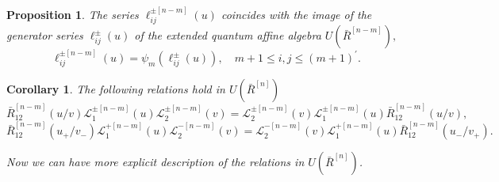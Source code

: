 \documentclass[10pt,a4paper]{amsart}
\newtheorem{coro}[theorem]{Corollary}
\newtheorem{proposition}[theorem]{Proposition}
\numberwithin{equation}{section}
\begin{document}
\begin{proposition}\cite{JLM2}
The series $\ell_{i j}^{ \pm[n-m]}(u)$ coincides with the image of the generator series $\ell_{i j}^{ \pm}(u)$ of the extended quantum affine algebra $U\left(\bar{R}^{[n-m]}\right),$
$$
\ell_{i j}^{ \pm[n-m]}(u)=\psi_m\left(\ell_{i j}^{ \pm}(u)\right), \quad m+1 \leqslant i, j \leqslant(m+1)^{\prime}.
$$ 	
\end{proposition}
\begin{coro}\cite{JLM2}\label{c:18}
 The following relations hold in $U\left(\bar{R}^{[n]}\right)$
 $$
 \bar{R}_{12}^{[n-m]}(u / v) \mathcal{L}_1^{ \pm[n-m]}(u) \mathcal{L}_2^{ \pm[n-m]}(v)=\mathcal{L}_2^{ \pm[n-m]}(v) \mathcal{L}_1^{ \pm[n-m]}(u) \bar{R}_{12}^{[n-m]}(u / v),
 $$	
 $$
 \bar{R}_{12}^{[n-m]}\left(u_{+} / v_{-}\right) \mathcal{L}_1^{+[n-m]}(u) \mathcal{L}_2^{-[n-m]}(v)=\mathcal{L}_2^{-[n-m]}(v) \mathcal{L}_1^{+[n-m]}(u) \bar{R}_{12}^{[n-m]}\left(u_{-} / v_{+}\right).
 $$

 Now we can have more explicit description of the relations in $U\left(\bar{R}^{[n]}\right)$.
\end{coro}	
\end{document}
